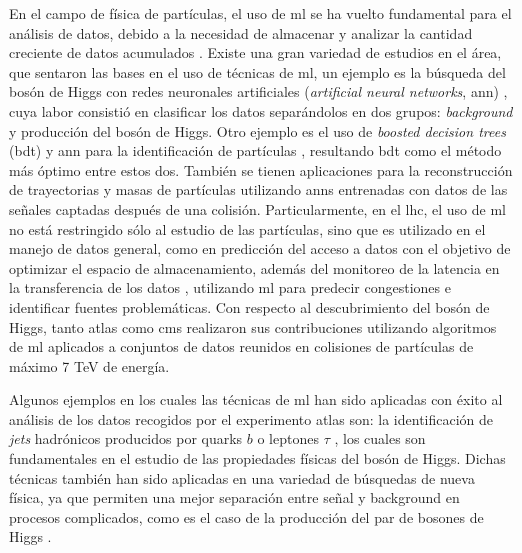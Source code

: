 En el campo de física de partículas, el uso de \acrshort{ml} se ha vuelto fundamental para el análisis de datos, debido a la necesidad de almacenar y analizar la cantidad creciente de datos acumulados \cite{Albertsson2018}. 
%
Existe una gran variedad de estudios en el área, que sentaron las bases en el uso de técnicas de \acrshort{ml}, un ejemplo es la búsqueda del bosón de Higgs con redes neuronales artificiales (\emph{artificial neural networks}, \acrshort{ann}) \cite{Chiappetta1994}, cuya labor consistió en clasificar los datos separándolos en dos grupos: \emph{background} y producción del bosón de Higgs. Otro ejemplo es el uso de \emph{boosted decision trees} (\acrshort{bdt}) y \acrshort{ann} para la identificación de partículas \cite{Roe2005}, resultando \acrshort{bdt} como el método más óptimo entre estos dos. También se tienen aplicaciones para la reconstrucción de trayectorias \cite{Peterson1989} y masas \cite{Lnnblad1992} de partículas utilizando \acrshort{ann}s entrenadas con datos de las señales captadas después de una colisión.
%
Particularmente, en el \acrshort{lhc}, el uso de \acrshort{ml} no está restringido sólo al estudio de las partículas, sino que es utilizado en el manejo de datos general, como en predicción del acceso a datos \cite{Kuznetsov2016} con el objetivo de optimizar el espacio de almacenamiento, además del monitoreo de la latencia en la transferencia de los datos \cite{Bonacorsi2015}, utilizando \acrshort{ml} para predecir congestiones e identificar fuentes problemáticas.
%
Con respecto al descubrimiento del bosón de Higgs, tanto \acrshort{atlas} \cite{Aad2012} \cite{Aad2012b} como \acrshort{cms} \cite{Chatrchyan2012} realizaron sus contribuciones utilizando algoritmos de \acrshort{ml} aplicados a conjuntos de datos reunidos en colisiones de partículas de máximo 7 TeV de energía.
%

Algunos ejemplos en los cuales las técnicas de \acrshort{ml} han sido aplicadas con éxito al análisis de los datos recogidos por el experimento \acrshort{atlas} son: la identificación de \emph{jets} hadrónicos producidos por quarks $b$ o leptones $\tau$ \cite{2016} \cite{ATLAS:2017mpa}, los cuales son fundamentales en el estudio de las propiedades físicas del bosón de Higgs. Dichas técnicas también han sido aplicadas en una variedad de búsquedas de nueva física, ya que permiten una mejor separación entre señal y background en procesos complicados, como es el caso de la producción del par de bosones de Higgs \cite{Aaboud2018}.
%

